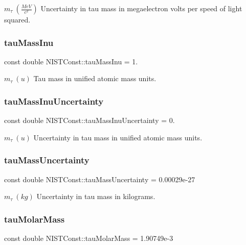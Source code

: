 $m_\tau \ (\frac{MeV}{c^2})$ Uncertainty in tau mass in megaelectron volts per speed of light squared. \mbox{\label{group___tau_gaa0a5019135251853d2761cb9af892aea}} 
\subsubsection{\texorpdfstring{tau\+Mass\+Inu}{tauMassInu}}
{\footnotesize\ttfamily const double N\+I\+S\+T\+Const\+::tau\+Mass\+Inu = 1.}

$m_\tau \ (u)$ Tau mass in unified atomic mass units. \mbox{\label{group___tau_gad6e1aecdf7331e89b665c40d7d6dad86}} 
\subsubsection{\texorpdfstring{tau\+Mass\+Inu\+Uncertainty}{tauMassInuUncertainty}}
{\footnotesize\ttfamily const double N\+I\+S\+T\+Const\+::tau\+Mass\+Inu\+Uncertainty = 0.}

$m_\tau \ (u)$ Uncertainty in tau mass in unified atomic mass units. \mbox{\label{group___tau_gad7d60828078581e6fc33f24fa369b9f2}} 
\subsubsection{\texorpdfstring{tau\+Mass\+Uncertainty}{tauMassUncertainty}}
{\footnotesize\ttfamily const double N\+I\+S\+T\+Const\+::tau\+Mass\+Uncertainty = 0.\+00029e-\/27}

$m_\tau \ (kg)$ Uncertainty in tau mass in kilograms. \mbox{\label{group___tau_ga07e317845454c4534cc0273efa2e55c6}} 
\subsubsection{\texorpdfstring{tau\+Molar\+Mass}{tauMolarMass}}
{\footnotesize\ttfamily const double N\+I\+S\+T\+Const\+::tau\+Molar\+Mass = 1.\+90749e-\/3}

